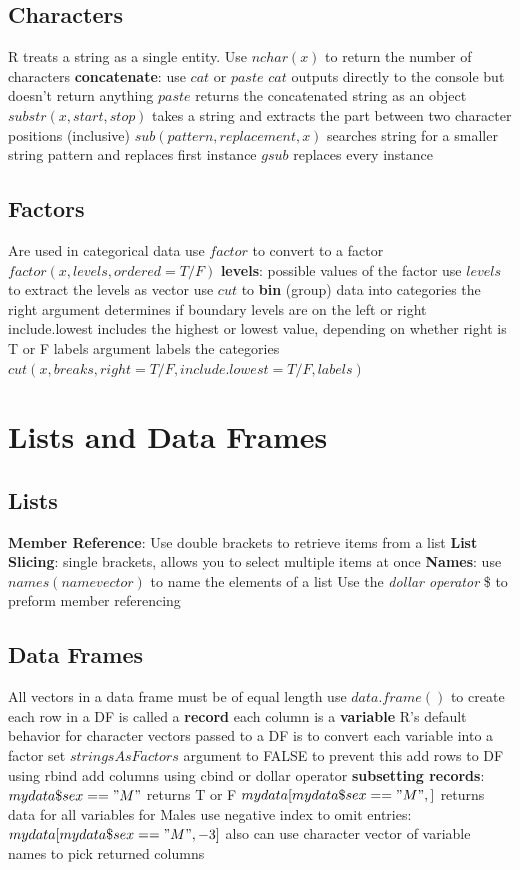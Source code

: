 \documentclass[openany]{book}
\begin{document}
\begin{flushleft}
\section{Characters}
R treats a string as a single entity. \medbreak
Use $nchar(x)$ to return the number of characters \medbreak
\textbf{concatenate}: use $cat$ or $paste$ \medbreak
$cat$ outputs directly to the console but doesn't return anything \medbreak
$paste$ returns the concatenated string as an object \medbreak
$substr(x,start,stop)$ takes a string and extracts the part between two character positions (inclusive) \medbreak
$sub(pattern, replacement, x)$ searches string for a smaller string pattern and replaces first instance \medbreak
$gsub$ replaces every instance
\section{Factors}
Are used in categorical data \medbreak
use $factor$ to convert to a factor \medbreak
$factor(x,levels,ordered=T/F)$ \medbreak
\textbf{levels}: possible values of the factor \medbreak
use $levels$ to extract the levels as vector \medbreak
use $cut$ to \textbf{bin} (group) data into categories \medbreak
the right argument determines if boundary levels are on the left or right \medbreak
include.lowest includes the highest or lowest value, depending on whether right is T or F \medbreak
labels argument labels the categories \medbreak
$cut(x,breaks,right=T/F,include.lowest=T/F,labels)$
\chapter{Lists and Data Frames}
\section{Lists}
\textbf{Member Reference}: Use double brackets to retrieve items from a list \medbreak
\textbf{List Slicing}: single brackets, allows you to select multiple items at once \medbreak
\textbf{Names}: use $names(name vector)$ to name the elements of a list \medbreak
Use the \textit{dollar operator} \$ to preform member referencing
\section{Data Frames}
All vectors in a data frame must be of equal length \medbreak
use $data.frame()$ to create \medbreak
each row in a DF is called a \textbf{record} \medbreak
each column is a \textbf{variable} \medbreak
R's default behavior for character vectors passed to a DF is to convert each variable into a factor \medbreak
set $stringsAsFactors$ argument to FALSE to prevent this \medbreak
add rows to DF using rbind add columns using cbind or dollar operator \medbreak
\textbf{subsetting records}: $mydata\$sex=="M"$ returns T or F \medbreak
$mydata[mydata\$sex=="M",]$ returns data for all variables for Males \medbreak
use negative index to omit entries: $mydata[mydata\$sex=="M",-3]$ \medbreak
also can use character vector of variable names to pick returned columns

\end{flushleft}
\end{document}
